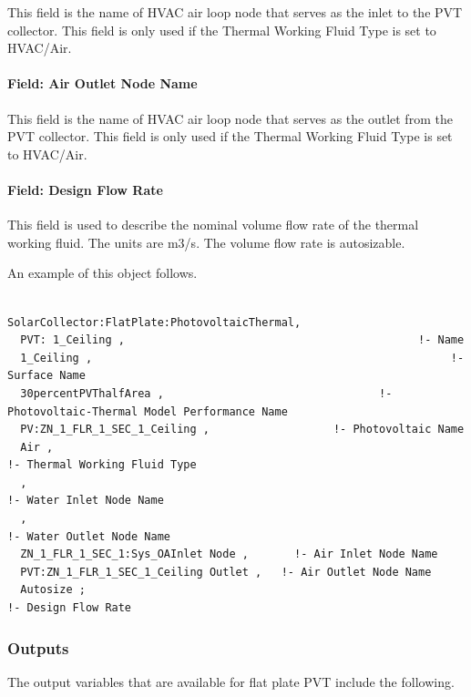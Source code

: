 This field is the name of HVAC air loop node that serves as the inlet to the PVT collector. This field is only used if the Thermal Working Fluid Type is set to HVAC/Air.

\paragraph{Field: Air Outlet Node Name}\label{field-air-outlet-node-name-005}

This field is the name of HVAC air loop node that serves as the outlet from the PVT collector. This field is only used if the Thermal Working Fluid Type is set to HVAC/Air.

\paragraph{Field: Design Flow Rate}\label{field-design-flow-rate-003}

This field is used to describe the nominal volume flow rate of the thermal working fluid. The units are m3/s. The volume flow rate is autosizable.

An example of this object follows.

\begin{lstlisting}

SolarCollector:FlatPlate:PhotovoltaicThermal,
  PVT: 1_Ceiling ,                                             !- Name
  1_Ceiling ,                                                       !- Surface Name
  30percentPVThalfArea ,                                 !- Photovoltaic-Thermal Model Performance Name
  PV:ZN_1_FLR_1_SEC_1_Ceiling ,                   !- Photovoltaic Name
  Air ,                                                                   !- Thermal Working Fluid Type
  ,                                                                           !- Water Inlet Node Name
  ,                                                                           !- Water Outlet Node Name
  ZN_1_FLR_1_SEC_1:Sys_OAInlet Node ,       !- Air Inlet Node Name
  PVT:ZN_1_FLR_1_SEC_1_Ceiling Outlet ,   !- Air Outlet Node Name
  Autosize ;                                                         !- Design Flow Rate
\end{lstlisting}

\subsubsection{Outputs}\label{outputs-3-018}

The output variables that are available for flat plate PVT include the following.

